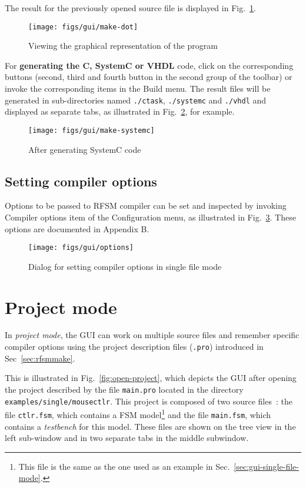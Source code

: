 The result for the previously opened source file is displayed in Fig.~\ref{fig:make-dot}.

\begin{figure}[h]
  \centering
  \texttt{[image: figs/gui/make-dot]}
  \caption{Viewing the graphical representation of the program}
  \label{fig:make-dot}
\end{figure}

\medskip For \textbf{generating the C, SystemC or VHDL} code, click on the corresponding buttons
(second, third and fourth button in the second group of the toolbar) or invoke the corresponding
items in the \textsf{Build} menu. The result files will be generated in sub-directories named
\verb|./ctask|, \verb|./systemc| and \verb|./vhdl| and displayed as separate tabs, as
illustrated in Fig.~\ref{fig:make-systemc}, for example.

\begin{figure}[h]
  \centering
  \texttt{[image: figs/gui/make-systemc]}
  \caption{After generating SystemC code}
  \label{fig:make-systemc}
\end{figure}

\subsection{Setting compiler options}
\label{sec:gui-setting-options}

Options to be passed to RFSM compiler can be set and inspected by invoking \textsf{Compiler options} item of the
\textsf{Configuration} menu, as illustrated in Fig.~\ref{fig:gui-compiler-options}. These options are
documented in Appendix B.

\begin{figure}[h]
  \centering
  \texttt{[image: figs/gui/options]}
  \caption{Dialog for setting compiler options in single file mode}
  \label{fig:gui-compiler-options}
\end{figure}

\section{Project mode}
\label{sec:gui-project-mode}

In \emph{project mode}, the GUI can work on multiple source files and remember specific compiler
options using the project description files (\verb|.pro|) introduced in Sec~\ref{sec:rfsmmake}.

This is illustrated in Fig.~\ref{fig:open-project}, which depicts the GUI after opening the project
described by the file \verb|main.pro| located in the directory \texttt{examples/single/mousectlr}.
This project is composed of two source files~: the file \verb|ctlr.fsm|, which contains a FSM
model\footnote{This file is the same as the one used as an example in
  Sec.~\ref{sec:gui-single-file-mode}.} and the file \verb|main.fsm|, which contains a
\emph{testbench} for this model. These files are shown on the tree view in the left sub-window and
in two separate tabs in the middle subwindow. 

